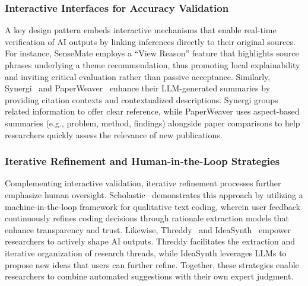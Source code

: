 \subsubsection{Interactive Interfaces for Accuracy Validation} A key design pattern embeds interactive mechanisms that enable real-time verification of AI outputs by linking inferences directly to their original sources. For instance, SenseMate \cite{sensemate} employs a ``View Reason'' feature that highlights source phrases underlying a theme recommendation, thus promoting local explainability and inviting critical evaluation rather than passive acceptance. Similarly, Synergi~\cite{synergi} and PaperWeaver~\cite{paperweaver} enhance their LLM-generated summaries by providing citation contexts and contextualized descriptions. Synergi groups related information to offer clear reference, while PaperWeaver uses aspect-based summaries (e.g., problem, method, findings) alongside paper comparisons to help researchers quickly assess the relevance of new publications.

\subsubsection{Iterative Refinement and Human-in-the-Loop Strategies} Complementing interactive validation, iterative refinement processes further emphasize human oversight. Scholastic~\cite{scholastic} demonstrates this approach by utilizing a machine-in-the-loop framework for qualitative text coding, wherein user feedback continuously refines coding decisions through rationale extraction models that enhance transparency and trust. Likewise, Threddy~\cite{threddy} and IdeaSynth~\cite{IdeaSynth} empower researchers to actively shape AI outputs. Threddy facilitates the extraction and iterative organization of research threads, while IdeaSynth leverages LLMs to propose new ideas that users can further refine. Together, these strategies enable researchers to combine automated suggestions with their own expert judgment.



